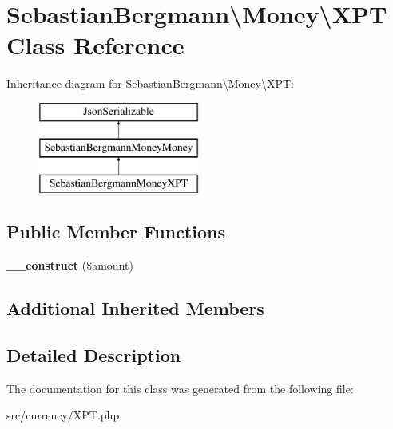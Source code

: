 \hypertarget{classSebastianBergmann_1_1Money_1_1XPT}{}\section{Sebastian\+Bergmann\textbackslash{}Money\textbackslash{}X\+P\+T Class Reference}
\label{classSebastianBergmann_1_1Money_1_1XPT}
Inheritance diagram for Sebastian\+Bergmann\textbackslash{}Money\textbackslash{}X\+P\+T\+:\begin{figure}[H]
\begin{center}
\leavevmode
\includegraphics[height=3.000000cm]{classSebastianBergmann_1_1Money_1_1XPT}
\end{center}
\end{figure}
\subsection*{Public Member Functions}
\begin{DoxyCompactItemize}
\item 
\hypertarget{classSebastianBergmann_1_1Money_1_1XPT_a67d198a6d5556bfffc1da63e65fdcf68}{}{\bfseries \+\_\+\+\_\+construct} (\$amount)\label{classSebastianBergmann_1_1Money_1_1XPT_a67d198a6d5556bfffc1da63e65fdcf68}

\end{DoxyCompactItemize}
\subsection*{Additional Inherited Members}


\subsection{Detailed Description}


The documentation for this class was generated from the following file\+:\begin{DoxyCompactItemize}
\item 
src/currency/X\+P\+T.\+php\end{DoxyCompactItemize}
